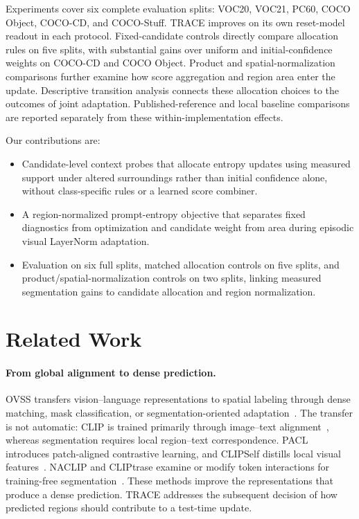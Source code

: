 \documentclass[letterpaper]{article}
\begin{document}
Experiments cover six complete evaluation splits: VOC20, VOC21, PC60, COCO Object, COCO-CD, and COCO-Stuff. TRACE improves on its own reset-model readout in each protocol. Fixed-candidate controls directly compare allocation rules on five splits, with substantial gains over uniform and initial-confidence weights on COCO-CD and COCO Object. Product and spatial-normalization comparisons further examine how score aggregation and region area enter the update. Descriptive transition analysis connects these allocation choices to the outcomes of joint adaptation. Published-reference and local baseline comparisons are reported separately from these within-implementation effects.

Our contributions are:
\begin{itemize}
\item Candidate-level context probes that allocate entropy updates using measured support under altered surroundings rather than initial confidence alone, without class-specific rules or a learned score combiner.
\item A region-normalized prompt-entropy objective that separates fixed diagnostics from optimization and candidate weight from area during episodic visual LayerNorm adaptation.
\item Evaluation on six full splits, matched allocation controls on five splits, and product/spatial-normalization controls on two splits, linking measured segmentation gains to candidate allocation and region normalization.
\end{itemize}

\section{Related Work}
\paragraph{From global alignment to dense prediction.}
OVSS transfers vision--language representations to spatial labeling through dense matching, mask classification, or segmentation-oriented adaptation~\cite{ghiasi2022openseg,liang2023ovseg,cho2024catseg}. The transfer is not automatic: CLIP is trained primarily through image--text alignment~\cite{radford2021clip}, whereas segmentation requires local region--text correspondence. PACL introduces patch-aligned contrastive learning, and CLIPSelf distills local visual features~\cite{mukhoti2023pacl,wu2024clipself}. NACLIP and CLIPtrase examine or modify token interactions for training-free segmentation~\cite{hajimiri2025naclip,shao2024cliptrase}. These methods improve the representations that produce a dense prediction. TRACE addresses the subsequent decision of how predicted regions should contribute to a test-time update.
\end{document}
